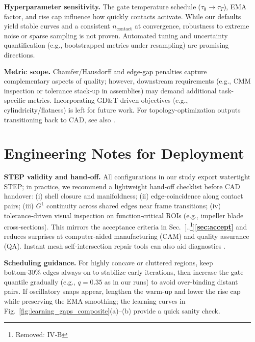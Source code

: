 \documentclass{ieeeaccess}
\providecommand{\DIFaddtex}[1]{{\color{blue}\bfseries #1}} %
\providecommand{\DIFdeltex}[1]{{\color{red}[..\footnote{\color{black}Removed: #1}]}} %
\providecommand{\DIFaddbegin}{} %
\providecommand{\DIFaddend}{} %
\providecommand{\DIFdelbegin}{} %
\providecommand{\DIFdelend}{} %
\providecommand{\DIFadd}[1]{\texorpdfstring{\DIFaddtex{#1}}{#1}} %
\providecommand{\DIFdel}[1]{\texorpdfstring{\DIFdeltex{#1}}{}} %
\begin{document}
\textbf{Hyperparameter sensitivity.} The gate temperature schedule
($\tau_0\!\to\!\tau_T$), EMA factor, and rise cap influence how quickly
contacts activate. While our defaults yield stable curves and a consistent
$n_{\text{contact}}$ at convergence, robustness to extreme noise or sparse
sampling is not proven. Automated tuning and uncertainty quantification
(e.g., bootstrapped metrics under resampling) are promising directions. 

\textbf{Metric scope.} Chamfer/Hausdorff and edge-gap penalties capture
complementary aspects of quality; however, downstream requirements
(e.g., CMM inspection or tolerance stack‑up in assemblies) may demand
additional task-specific metrics. Incorporating GD\&T-driven objectives
(e.g., cylindricity/flatness) is left for future work. For topology-optimization outputs transitioning back to CAD, see also \cite{b26}.

\section{Engineering Notes for Deployment}
\label{sec:engnotes}

\textbf{STEP validity and hand‑off.} All configurations in our study export
watertight STEP; in practice, we recommend a lightweight hand‑off
checklist before CAD handover: (i) shell closure and manifoldness; (ii)
edge‑coincidence along contact pairs; (iii) $G^1$ continuity across shared
edges near frame transitions; (iv) tolerance‑driven visual inspection on
function‑critical ROIs (e.g., impeller blade cross‑sections). This mirrors
the acceptance criteria in Sec.~\DIFdelbegin \DIFdel{IV‑B }\DIFdelend \DIFaddbegin \DIFadd{\ref{sec:accept} }\DIFaddend and reduces surprises at computer-aided manufacturing (CAM) and quality assurance (QA). Instant mesh self-intersection repair tools can also aid diagnostics \cite{b12}.


\textbf{Scheduling guidance.} For highly concave or cluttered regions,
keep bottom‑30\% edges always‑on to stabilize early iterations, then
increase the gate quantile gradually (e.g., $q\!=\!0.35$ as in our runs) to
avoid over‑binding distant pairs. If oscillatory snaps appear, lengthen the
warm‑up and lower the rise cap while preserving the EMA smoothing;
the learning curves in Fig.~\ref{fig:learning_gaps_composite}(a)–(b) provide a quick sanity
check. 
\end{document}
